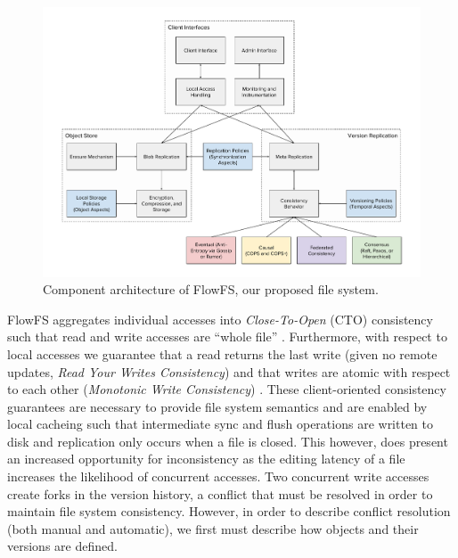 \documentclass{article}
\begin{document}
\begin{figure}
    \centering
        \includegraphics[width=\textwidth]{figures/architecture}
        \caption{Component architecture of FlowFS, our proposed file system.}
        \label{fig:architecture}
\end{figure}

FlowFS aggregates individual accesses into \textit{Close-To-Open} (CTO) consistency such that read and write accesses are ``whole file'' \cite{muthitacharoen_low-bandwidth_2001}. Furthermore, with respect to local accesses we guarantee that a read returns the last write (given no remote updates, \textit{Read Your Writes Consistency}) and that writes are atomic with respect to each other (\textit{Monotonic Write Consistency}) \cite{bermbach_consistency_2013}. These client-oriented consistency guarantees are necessary to provide file system semantics and are enabled by local cacheing such that intermediate sync and flush operations are written to disk and replication only occurs when a file is closed. This however, does present an increased opportunity for inconsistency as the editing latency of a file increases the likelihood of concurrent accesses. Two concurrent write accesses create forks in the version history, a conflict that must be resolved in order to maintain file system consistency. However, in order to describe conflict resolution (both manual and automatic), we first must describe how objects and their versions are defined.
\end{document}
